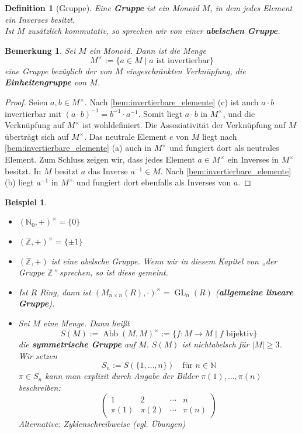 \documentclass[a4paper, twoside, 11pt, ngerman]{report}
\newcommand{\NN}{\mathds N}
\newcommand{\ZZ}{\mathds Z}
\DeclareMathOperator{\Abb}{Abb}
\DeclareMathOperator{\GL}{GL}
\theoremstyle{definistyle}
\newtheorem{defini}[satz]{Definition}
\newtheorem{bem}[satz]{Bemerkung}
\newtheorem{bsp}[satz]{Beispiel}
\theoremstyle{remark}
\newcommand{\defn}[1]{\textit{\bfseries #1}}
\begin{document}
\begin{defini}[Gruppe]\label{def:gruppe}
Eine \defn{Gruppe} ist ein Monoid $ M $, in dem jedes Element ein Inverses besitzt.\\
Ist $ M $ zusätzlich kommutativ, so sprechen wir von einer \defn{abelschen Gruppe}.
\end{defini}

\begin{bem}\label{bem:einheitengruppe}
Sei $ M $ ein Monoid. Dann ist die Menge
\[
M^{\times} := \{ a \in M \mid a \text{ ist invertierbar} \}
\]
eine Gruppe bezüglich der von $M$ eingeschränkten Verknüpfung, die \defn{Einheitengruppe} von $ M $.
\end{bem}


\begin{proof}
Seien $ a, b \in M^{\times} $. Nach \ref{bem:invertierbare_elemente} (c) ist auch $ a \cdot b $ invertierbar mit $(a \cdot b)^{-1} = b^{-1} \cdot a^{-1}$. Somit liegt $ a \cdot b $ in $ M^{\times} $, und die Verknüpfung auf $M^\times$ ist wohldefiniert. Die Assoziativität der Verknüpfung auf $M$ überträgt sich auf $ M^{\times} $. Das neutrale Element $ e $ von $ M $ liegt nach \ref{bem:invertierbare_elemente} (a) auch in $ M^{\times} $ und fungiert dort als neutrales Element.
Zum Schluss zeigen wir, dass jedes Element $a\in M^{\times} $ ein Inverses in $M^\times$ besitzt. In $M$ besitzt $a$ das Inverse $ a^{-1}\in M$. Nach \ref{bem:invertierbare_elemente} (b) liegt $ a^{-1} $ in $ M^{\times} $ und fungiert dort ebenfalls als Inverses von $a$.
\end{proof}


\begin{bsp}\label{bsp:einheitengruppe_weiter}
\begin{itemize}
    \item[(a)] $ (\NN_0, +)^{\times} = \{ 0 \} $
    \item[(b)] $ (\ZZ, +)^{\times} = \{ \pm 1 \} $
    \item[(c)] $ (\ZZ, +) $ ist eine abelsche Gruppe. Wenn wir in diesem Kapitel von „der Gruppe $\ZZ$” sprechen, so ist diese gemeint.
    \item[(d)] Ist $ R $ Ring, dann ist $ (M_{n \times n}(R), \cdot)^{\times} = \GL_n(R) $ (\defn{allgemeine lineare Gruppe}).
    \item[(e)] Sei $ M $ eine Menge. Dann heißt
    \[ S(M) := \Abb(M, M)^{\times} := \{ f: M \to M \mid f \text{ bijektiv} \} \] die \defn{symmetrische Gruppe} auf $ M $. $ S(M) $ ist nichtabelsch für $ |M| \geq 3 $. Wir setzen
\[
S_n := S(\{ 1, \dots, n \}) \quad \text{für } n \in \NN
\]
$ \pi \in S_n $ kann man explizit durch Angabe der Bilder $ \pi(1), \dots, \pi(n) $ beschreiben:
\[
\begin{pmatrix} 1 & 2 & \cdots & n \\ \pi(1) & \pi(2) & \cdots & \pi(n) \end{pmatrix}
\]
Alternative: Zyklenschreibweise (vgl. Übungen)
\end{itemize}
\end{bsp}
\end{document}
